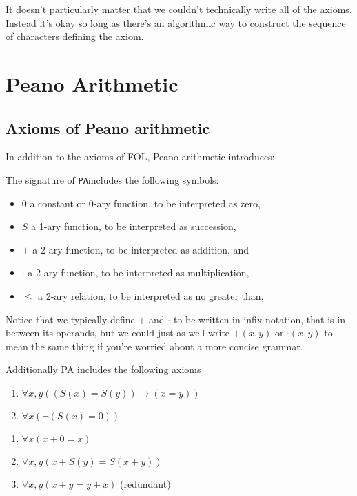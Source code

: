 \documentclass[10pt]{article}
\newcommand{\PA}{\texttt{PA}}
\begin{document}
	It doesn't particularly matter that we couldn't technically write all of the axioms.
	Instead it's okay so long as there's an algorithmic way to construct the sequence of characters defining the axiom.
	 
	\section{Peano Arithmetic}
	
	\subsection{Axioms of Peano arithmetic}
	In addition to the axioms of FOL, Peano arithmetic introduces:
	
	The signature of \PA includes the following symbols:
	\begin{itemize}
		\item $0$ a constant or 0-ary function, to be interpreted as zero,
		\item $S$ a 1-ary function, to be interpreted as succession,
		\item $+$ a 2-ary function, to be interpreted as addition, and
		\item $\cdot$ a 2-ary function, to be interpreted as multiplication,
		\item $\le$ a 2-ary relation, to be interpreted as no greater than,
	\end{itemize}
	
	Notice that we typically define $+$ and $\cdot$ to be written in infix notation, that is in-between its operands, but we could just as well write $+(x, y)$ or $\cdot(x, y)$ to mean the same thing if you're worried about a more concise grammar.
	
	Additionally PA includes the following axioms
	
	\begin{tcolorbox}[colback=green!5!white,colframe=green!75!black,title={\bf Successor axioms}]
		\begin{enumerate}[label=S.\arabic*]
			\item $\forall x, y ((S(x)=S(y)) \to (x=y))$ \label{ax:succ-inj}
			\item $\forall x (\lnot (S(x)=0))$ \label{ax:succ-first}
		\end{enumerate}
	\end{tcolorbox}
	
	\begin{tcolorbox}[colback=green!5!white,colframe=green!75!black,title={\bf Addition axioms}]
		\begin{enumerate}[label=A.\arabic*]
			\item $\forall x (x+0 = x)$ \label{ax:add-id}
			\item $\forall x, y (x+S(y) = S(x+y))$ \label{ax:add-succ}
			\item $\forall x, y (x+y=y+x)$ (redundant) \label{ax:add-sym}
		\end{enumerate}
	\end{tcolorbox}
	
\end{document}
